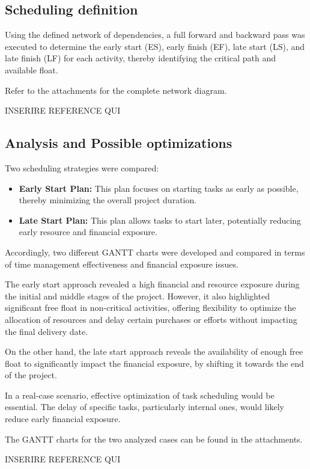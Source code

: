 \documentclass[12pt]{article}
\begin{document}
\subsection{Scheduling definition}
Using the defined network of dependencies, a full forward and backward pass was executed to determine the early start (ES), early finish (EF), late start (LS), and late finish (LF) for each activity, thereby identifying the critical path and available float.

Refer to the attachments for the complete network diagram.

INSERIRE REFERENCE QUI

\subsection{Analysis and Possible optimizations}
Two scheduling strategies were compared:
\begin{itemize}
        \item \textbf{Early Start Plan:} This plan focuses on starting tasks as early as possible, thereby minimizing the overall project duration.
        \item \textbf{Late Start Plan:} This plan allows tasks to start later, potentially reducing early resource and financial exposure.
\end{itemize}

Accordingly, two different GANTT charts were developed and compared in terms of time management effectiveness and financial exposure issues.

The early start approach revealed a high financial and resource exposure during the initial and middle stages of the project. However, it also highlighted significant free float in non-critical activities, offering flexibility to optimize the allocation of resources and delay certain purchases or efforts without impacting the final delivery date.

On the other hand, the late start approach reveals the availability of enough free float to significantly impact the financial exposure, by shifting it towards the end of the project.

In a real-case scenario, effective optimization of task scheduling would be essential. The delay of specific tasks, particularly internal ones, would likely reduce early financial exposure.

The GANTT charts for the two analyzed cases can be found in the attachments.

INSERIRE REFERENCE QUI
\end{document}
